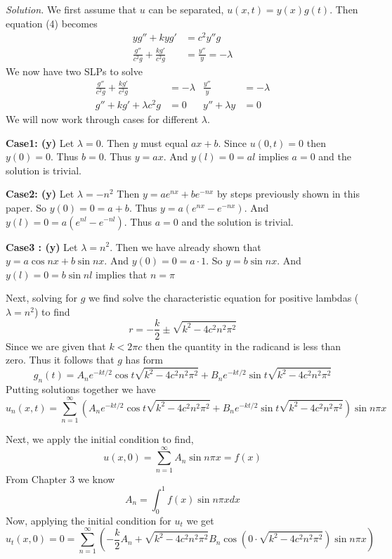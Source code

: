 \documentclass{article}
\begin{document}
\vspace{3mm}
\textit{Solution.} We first assume that \(u\) can be separated, \(u(x,t) = y(x)g(t)\). Then equation (4) becomes 
\begin{align*}
yg'' + kyg' &= c^2 y'' g \\
\frac{g''}{c^2 g} + \frac{k g'}{c^2 g} &= \frac{y''}{y} = -\lambda 
\end{align*}
We now have two SLPs to solve
\begin{align*}
\frac{g''}{c^2 g} + \frac{k g'}{c^2 g} &= -\lambda &    \frac{y''}{y} &= -\lambda \\
g'' + kg' +\lambda c^2 g &= 0 &  y'' +\lambda y  &=0 
\end{align*}
We will now work through cases for different \(\lambda\). 

\textbf{Case1: (y)} Let \( \lambda = 0\). Then \(y\) must equal \(ax+b\). Since \(u(0,t)=0\) then \(y(0) = 0\). Thus \(b=0\). Thus \(y=ax\). And \(y(l)=0 = al\) implies \(a=0\) and the solution is trivial. 

\textbf{Case2: (y)} Let \(\lambda=-n^2\) Then \(y= ae^{nx} + be^{-nx} \) by steps previously shown in this paper. So \(y(0) = 0=a+b\). Thus \(y=a(e^{nx}-e^{-nx})\).  And \(y(l) = 0 =a (e^{nl}-e^{-nl} )\). Thus \(a=0\) and the solution is trivial. 

\textbf{Case3 : (y)} Let \(\lambda = n^2\). Then we have already shown that \(y= a\cos nx + b \sin nx \).  And \(y(0) =0 = a\cdot1\). So \( y= b\sin nx\). And \(y(l)=0 = b \sin nl\) implies that  \( n = \pi  \) 

Next, solving for \(g\) we find solve the characteristic equation for positive lambdas (\(\lambda = n^2\)) to find 
\[
r = -\frac k2 \pm \sqrt{k^2 - 4c^2n^2\pi^2} 
\]
Since we are given that \(k<2\pi c\) then the quantity in the radicand is less than zero. Thus it follows that  \(g\) has form 
\[
g_n(t) = A_n e^{-kt/2}\cos t\sqrt{k^2 - 4c^2n^2\pi^2}  + B_ne^{-kt/2} \sin  t\sqrt{k^2 - 4c^2n^2\pi^2} 
\]
Putting solutions together we have 
\[
u_n(x,t) = \sum_{n=1}^\infty (A_n e^{-kt/2}\cos t\sqrt{k^2 - 4c^2n^2\pi^2}  + B_ne^{-kt/2} \sin  t\sqrt{k^2 - 4c^2n^2\pi^2} ) \sin n\pi x 
\]

Next, we apply the initial condition to find, 
\[
u(x,0)=  \sum_{n=1}^\infty A_n \sin n\pi x =f(x)
\]
From Chapter 3 we know
\[
A_n = \int_0^1 f(x) \sin n\pi x dx 
\]
Now, applying the initial condition for \(u_t\) we get
\[
u_t(x,0) =0=  \sum_{n=1}^\infty(-\frac k2 A_n +  \sqrt{k^2 - 4c^2n^2\pi^2} B_n \cos( 0 \cdot \sqrt{k^2 - 4c^2n^2\pi^2})\sin n\pi x    ) 
\]
\end{document}

